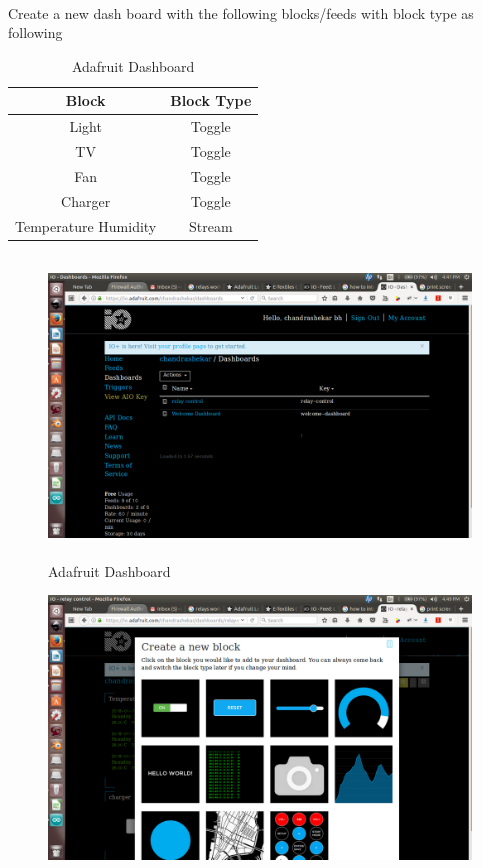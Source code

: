 \documentclass[12pt,a4paper]{article}
\begin{document}
\begin{flushleft}
 \\
Create  a new dash board with the following blocks/feeds with block type as following \\
\begin{table}[]
\centering
\caption{Adafruit Dashboard}
\begin{tabular}{|c|c|}
\hline
\textbf{Block} & \textbf{Block Type} \\ \hline
Light & Toggle \\ \hline
TV & Toggle \\ \hline
Fan & Toggle \\ \hline
Charger & Toggle \\ \hline
Temperature Humidity & Stream \\ \hline
\end{tabular}
\end{table}
\begin{figure}[h!]
    \centering
	\includegraphics[width=12cm, height=8cm]{Prog10/11.png}
	\caption{Adafruit Dashboard}
\end{figure}
\begin{figure}[h!]
    \centering
	\includegraphics[width=12cm, height=7cm]{Prog10/12.png}

\end{figure}
\end{flushleft}
\end{document}
